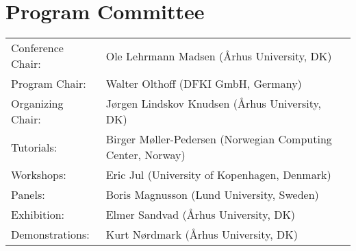 \documentclass{llncs}
\begin{document}
\section*{Program Committee}
\begin{tabular}{@{}p{5cm}@{}p{7.2cm}@{}}
Conference Chair:&Ole Lehrmann Madsen (\AA rhus University, DK)\\
Program Chair:   &Walter Olthoff (DFKI GmbH, Germany)\\
Organizing Chair:&J\o rgen Lindskov Knudsen (\AA rhus University, DK)\\
Tutorials:&Birger M\o ller-Pedersen\hfil\break
(Norwegian Computing Center, Norway)\\
Workshops:&Eric Jul (University of Kopenhagen, Denmark)\\
Panels:&Boris Magnusson (Lund University, Sweden)\\
Exhibition:&Elmer Sandvad (\AA rhus University, DK)\\
Demonstrations:&Kurt N\o rdmark (\AA rhus University, DK)
\end{tabular}
%
\end{document}
